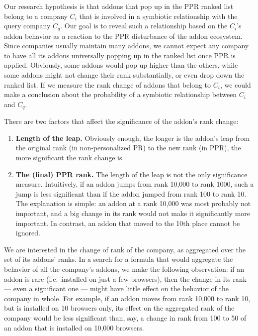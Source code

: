 \documentclass[11pt,oneside]{book}
\begin{document}
Our research hypothesis is that addons that pop up in the PPR ranked list belong to a company $C_i$ that is involved in a symbiotic relationship with the query company $C_q$. Our goal is to reveal such a relationship based on the $C_i$'s addon behavior as a reaction to the PPR disturbance of the addon ecosystem. Since companies usually maintain many addons, we cannot expect any company to have all its addons universally popping up in the ranked list once PPR is applied. Obviously, some addons would pop up higher than the others, while some addons might not change their rank substantially, or even drop down the ranked list. If we measure the rank change of addons that belong to $C_i$, we could make a conclusion about the probability of a symbiotic relationship between $C_i$ and $C_q$.

There are two factors that affect the significance of the addon's rank change:
\begin{enumerate}
\item \textbf{Length of the leap.} Obviously enough, the longer is the addon's leap from the original rank (in non-personalized PR) to the new rank (in PPR), the more significant the rank change is.
\item \textbf{The (final) PPR rank.} The length of the leap is not the only significance measure. Intuitively, if an addon jumps from rank 10,000 to rank 1000, such a jump is less significant than if the addon jumped from rank 100 to rank 10. The explanation is simple: an addon at a rank 10,000 was most probably not important, and a big change in its rank would not make it significantly more important. In contrast, an addon that moved to the 10th place cannot be ignored.
\end{enumerate}

We are interested in the change of rank of the company, as aggregated over the set of its addons' ranks. In a search for a formula that would aggregate the behavior of all the company's addons, we make the following observation: if an addon is rare (i.e.~installed on just a few browsers), then the change in its rank --- even a significant one --- might have little effect on the behavior of the company in whole. For example, if an addon moves from rank 10,000 to rank 10, but is installed on 10 browsers only, its effect on the aggregated rank of the company would be less significant than, say, a change in rank from 100 to 50 of an addon that is installed on 10,000 browsers.
\end{document}
